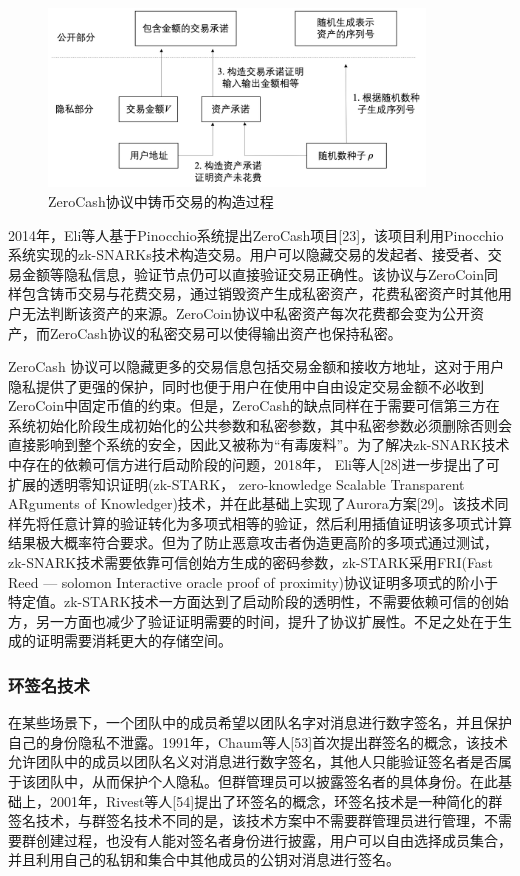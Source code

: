 \begin{figure}
\centering
\includegraphics[width=10cm]{figures/zerocash.png}
\caption{ZeroCash协议中铸币交易的构造过程}
\label{fig:zerocash}
\end{figure}

2014年，Eli等人基于Pinocchio系统提出ZeroCash项目[23]，该项目利用Pinocchio系统实现的zk-SNARKs技术构造交易。用户可以隐藏交易的发起者、接受者、交易金额等隐私信息，验证节点仍可以直接验证交易正确性。该协议与ZeroCoin同样包含铸币交易与花费交易，通过销毁资产生成私密资产，花费私密资产时其他用户无法判断该资产的来源。ZeroCoin协议中私密资产每次花费都会变为公开资产，而ZeroCash协议的私密交易可以使得输出资产也保持私密。

ZeroCash 协议可以隐藏更多的交易信息包括交易金额和接收方地址，这对于用户隐私提供了更强的保护，同时也便于用户在使用中自由设定交易金额不必收到ZeroCoin中固定币值的约束。但是，ZeroCash的缺点同样在于需要可信第三方在系统初始化阶段生成初始化的公共参数和私密参数，其中私密参数必须删除否则会直接影响到整个系统的安全，因此又被称为“有毒废料”。为了解决zk-SNARK技术中存在的依赖可信方进行启动阶段的问题，2018年， Eli等人[28]进一步提出了可扩展的透明零知识证明(zk-STARK， zero-knowledge Scalable Transparent ARguments of Knowledger)技术，并在此基础上实现了Aurora方案[29]。该技术同样先将任意计算的验证转化为多项式相等的验证，然后利用插值证明该多项式计算结果极大概率符合要求。但为了防止恶意攻击者伪造更高阶的多项式通过测试，zk-SNARK技术需要依靠可信创始方生成的密码参数，zk-STARK采用FRI(Fast Reed — solomon Interactive oracle proof of proximity)协议证明多项式的阶小于特定值。zk-STARK技术一方面达到了启动阶段的透明性，不需要依赖可信的创始方，另一方面也减少了验证证明需要的时间，提升了协议扩展性。不足之处在于生成的证明需要消耗更大的存储空间。

\subsubsection{环签名技术}

在某些场景下，一个团队中的成员希望以团队名字对消息进行数字签名，并且保护自己的身份隐私不泄露。1991年，Chaum等人[53]首次提出群签名的概念，该技术允许团队中的成员以团队名义对消息进行数字签名，其他人只能验证签名者是否属于该团队中，从而保护个人隐私。但群管理员可以披露签名者的具体身份。在此基础上，2001年，Rivest等人[54]提出了环签名的概念，环签名技术是一种简化的群签名技术，与群签名技术不同的是，该技术方案中不需要群管理员进行管理，不需要群创建过程，也没有人能对签名者身份进行披露，用户可以自由选择成员集合，并且利用自己的私钥和集合中其他成员的公钥对消息进行签名。

